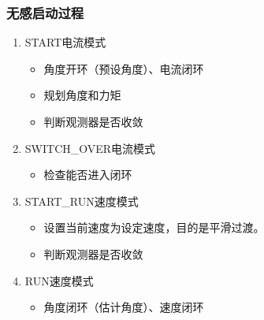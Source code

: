 ﻿\documentclass[12pt,a4paper]{article}
\begin{document}
\subsubsection{无感启动过程}
\begin{enumerate}
  \item  START电流模式
        \begin{itemize}
          \item 角度开环（预设角度）、电流闭环
          \item 规划角度和力矩
          \item 判断观测器是否收敛
        \end{itemize}

  \item SWITCH\_OVER电流模式
        \begin{itemize}
          \item 检查能否进入闭环
        \end{itemize}
  \item START\_RUN速度模式
        \begin{itemize}
          \item 设置当前速度为设定速度，目的是平滑过渡。
          \item 判断观测器是否收敛
        \end{itemize}
  \item RUN速度模式
        \begin{itemize}
          \item 角度闭环（估计角度）、速度闭环
        \end{itemize}

\end{enumerate}

\end{document}
